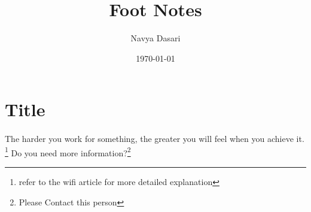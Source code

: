 \documentclass{article}
\title{Foot Notes}
\author{Navya Dasari}
\date{\today}
\begin{document}
	\maketitle
	
	\section{Title}
	\paragraph{}
	
	The harder you work for something, the greater you will feel when you achieve it. \footnote{refer to the wifi article for more detailed explanation}
	Do you need more information?\footnote{Please Contact this person}
	 
\end{document}
